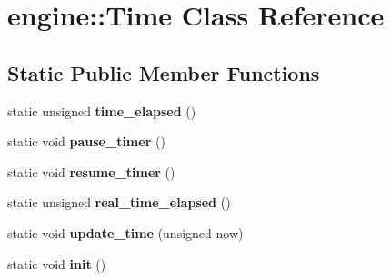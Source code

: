 \hypertarget{classengine_1_1_time}{}\section{engine\+:\+:Time Class Reference}
\label{classengine_1_1_time}
\subsection*{Static Public Member Functions}
\begin{DoxyCompactItemize}
\item 
static unsigned {\bfseries time\+\_\+elapsed} ()\hypertarget{classengine_1_1_time_a34c6353509709b70415bef938531eb92}{}\label{classengine_1_1_time_a34c6353509709b70415bef938531eb92}

\item 
static void {\bfseries pause\+\_\+timer} ()\hypertarget{classengine_1_1_time_ac04d488ad4706f86073f0e3aabd19c2a}{}\label{classengine_1_1_time_ac04d488ad4706f86073f0e3aabd19c2a}

\item 
static void {\bfseries resume\+\_\+timer} ()\hypertarget{classengine_1_1_time_a5d5df71d480f8b3d6dfe5d78870a5b79}{}\label{classengine_1_1_time_a5d5df71d480f8b3d6dfe5d78870a5b79}

\item 
static unsigned {\bfseries real\+\_\+time\+\_\+elapsed} ()\hypertarget{classengine_1_1_time_adf4f08d30fcf9839f534fd9b39cd2dc2}{}\label{classengine_1_1_time_adf4f08d30fcf9839f534fd9b39cd2dc2}

\item 
static void {\bfseries update\+\_\+time} (unsigned now)\hypertarget{classengine_1_1_time_a2b04ecff9825dbea41e8efa3300dc147}{}\label{classengine_1_1_time_a2b04ecff9825dbea41e8efa3300dc147}

\item 
static void {\bfseries init} ()\hypertarget{classengine_1_1_time_ac626e60d7767728dca61c1095cb9678c}{}\label{classengine_1_1_time_ac626e60d7767728dca61c1095cb9678c}

\end{DoxyCompactItemize}
